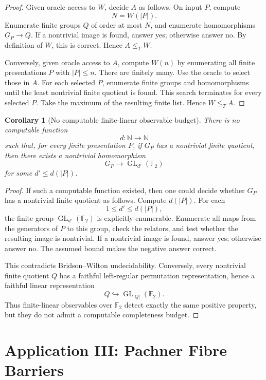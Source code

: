 \documentclass[11pt]{article}
\newtheorem{corollary}[theorem]{Corollary}
\begin{document}
\begin{proof}
Given oracle access to \(W\), decide \(A\) as follows. On input \(P\), compute
\[
N=W(|P|).
\]
Enumerate finite groups \(Q\) of order at most \(N\), and enumerate homomorphisms \(G_P\to Q\). If a nontrivial image is found, answer yes; otherwise answer no. By definition of \(W\), this is correct. Hence \(A\leq_T W\).

Conversely, given oracle access to \(A\), compute \(W(n)\) by enumerating all finite presentations \(P\) with \(|P|\leq n\). There are finitely many. Use the oracle to select those in \(A\). For each selected \(P\), enumerate finite groups and homomorphisms until the least nontrivial finite quotient is found. This search terminates for every selected \(P\). Take the maximum of the resulting finite list. Hence \(W\leq_T A\).
\end{proof}

\begin{corollary}[No computable finite-linear observable budget]
There is no computable function
\[
d:\mathbb N\to\mathbb N
\]
such that, for every finite presentation \(P\), if \(G_P\) has a nontrivial finite quotient, then there exists a nontrivial homomorphism
\[
G_P\to \operatorname{GL}_{d'}(\mathbb F_2)
\]
for some \(d'\leq d(|P|)\).
\end{corollary}

\begin{proof}
If such a computable function existed, then one could decide whether \(G_P\) has a nontrivial finite quotient as follows. Compute \(d(|P|)\). For each
\[
1\leq d'\leq d(|P|),
\]
the finite group \(\operatorname{GL}_{d'}(\mathbb F_2)\) is explicitly enumerable. Enumerate all maps from the generators of \(P\) to this group, check the relators, and test whether the resulting image is nontrivial. If a nontrivial image is found, answer yes; otherwise answer no. The assumed bound makes the negative answer correct.

This contradicts Bridson--Wilton undecidability. Conversely, every nontrivial finite quotient \(Q\) has a faithful left-regular permutation representation, hence a faithful linear representation
\[
Q\hookrightarrow \operatorname{GL}_{|Q|}(\mathbb F_2).
\]
Thus finite-linear observables over \(\mathbb F_2\) detect exactly the same positive property, but they do not admit a computable completeness budget.
\end{proof}

\section{Application III: Pachner Fibre Barriers}
\end{document}
